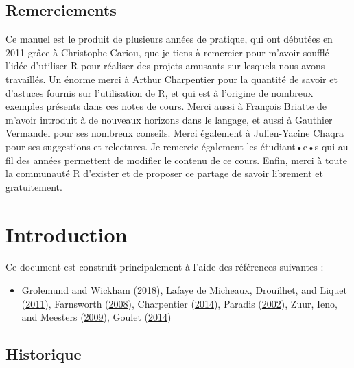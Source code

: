 \documentclass[
  11pt,
]{book}
\providecommand{\tightlist}{%
  \setlength{\itemsep}{0pt}\setlength{\parskip}{0pt}}
\numberwithin{equation}{section}
\numberwithin{countremarque}{section}
\begin{document}
\hypertarget{remerciements}{%
\section{Remerciements}\label{remerciements}}

Ce manuel est le produit de plusieurs années de pratique, qui ont débutées en 2011 grâce à Christophe Cariou, que je tiens à remercier pour m'avoir soufflé l'idée d'utiliser R pour réaliser des projets amusants sur lesquels nous avons travaillés. Un énorme merci à Arthur Charpentier pour la quantité de savoir et d'astuces fournis sur l'utilisation de R, et qui est à l'origine de nombreux exemples présents dans ces notes de cours. Merci aussi à François Briatte de m'avoir introduit à de nouveaux horizons dans le langage, et aussi à Gauthier Vermandel pour ses nombreux conseils. Merci également à Julien-Yacine Chaqra pour ses suggestions et relectures. Je remercie également les étudiant•e•s qui au fil des années permettent de modifier le contenu de ce cours. Enfin, merci à toute la communauté R d'exister et de proposer ce partage de savoir librement et gratuitement.

\hypertarget{introduction}{%
\chapter{Introduction}\label{introduction}}

Ce document est construit principalement à l'aide des références suivantes :

\begin{itemize}
\tightlist
\item
  Grolemund and Wickham (\protect\hyperlink{ref-grolemund_2018_r}{2018}), Lafaye de Micheaux, Drouilhet, and Liquet (\protect\hyperlink{ref-Lafaye_2011_Logiciel}{2011}), Farnsworth (\protect\hyperlink{ref-Farnsworth_2008_Econometrics}{2008}), Charpentier (\protect\hyperlink{ref-Charpentier_2014_Computational}{2014}), Paradis (\protect\hyperlink{ref-Paradis_2002_R}{2002}), Zuur, Ieno, and Meesters (\protect\hyperlink{ref-Zuur_2009_Beginner}{2009}), Goulet (\protect\hyperlink{ref-Goulet_2014_Introduction}{2014})
\end{itemize}

\hypertarget{historique}{%
\section{Historique}\label{historique}}
\end{document}
